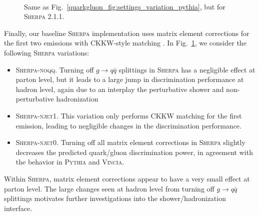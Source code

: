 \documentclass[11pt]{cernrep}
\begin{document}
\begin{figure}
\centering
{}
$\qquad$
\caption{Same as Fig.~\ref{quarkgluon_fig:settings_variation_pythia}, but for \textsc{Sherpa 2.1.1}.}
\label{quarkgluon_fig:settings_variation_sherpa}
\end{figure}

Finally, our baseline \textsc{Sherpa} implementation uses matrix element corrections for the first two emissions with CKKW-style matching \cite{Catani:2001cc}.  In Fig.~\ref{quarkgluon_fig:settings_variation_sherpa}, we consider the following \textsc{Sherpa} variations:
\begin{itemize}
\item \textsc{Sherpa-noqq}.  Turning off $g \to q \bar{q}$ splittings in \textsc{Sherpa} has a negligible effect at parton level, but it leads to a large jump in discrimination performance at hadron level, again due to an interplay the perturbative shower and non-perturbative hadronization
\item \textsc{Sherpa-njet1}.  This variation only performs CKKW matching for the first emission, leading to negligible changes in the discrimination performance.
\item \textsc{Sherpa-njet0}.  Turning off all matrix element corrections in \textsc{Sherpa} slightly decreases the predicted quark/gluon discrimination power, in agreement with the behavior in \textsc{Pythia} and \textsc{Vincia}.
\end{itemize}
Within \textsc{Sherpa}, matrix element corrections appear to have a very small effect at parton level.  The large changes seen at hadron level from turning off $g \to q \bar{q}$ splittings motivates further investigations into the shower/hadronization interface.
\end{document}
